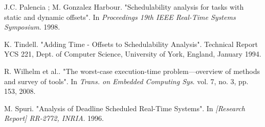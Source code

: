 \documentclass{article}
\begin{document}
\begin{thebibliography}{1}
J.C. Palencia ; M. Gonzalez Harbour.
\newblock "Schedulability analysis for tasks with static and dynamic offsets".
\newblock In {\em Proceedings 19th IEEE Real-Time Systems Symposium}. 1998.

K. Tindell.
\newblock "Adding Time - Offsets to Schedulability Analysis".
\newblock Technical Report YCS 221, Dept. of Computer Science, University of York, England, January 1994.

R. Wilhelm et al..
\newblock "The worst-case execution-time problem—overview of methods and survey of tools".
\newblock In {\em Trans. on Embedded Computing Sys}. vol. 7, no. 3, pp. 153, 2008.

M. Spuri.
\newblock "Analysis of Deadline Scheduled Real-Time Systems".
\newblock In {\em [Research Report] RR-2772, INRIA}. 1996.

\end{thebibliography}
\end{document}
